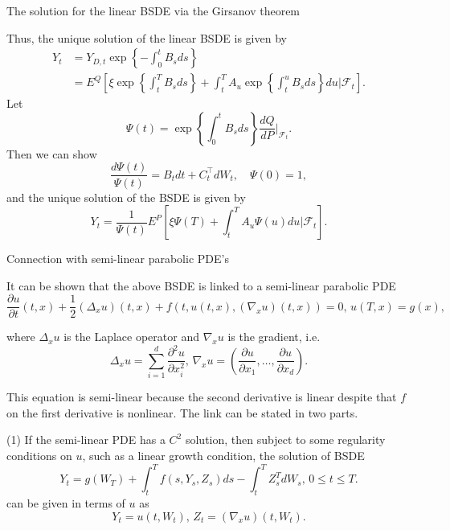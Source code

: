 \documentclass{beamer}
\begin{document}
\begin{frame}{The solution for the linear BSDE via the Girsanov theorem}

    {\footnotesize \footnotesize
     Thus, the unique solution of the linear BSDE is given by
     \begin{align*}
        Y_t &= Y_{D,t} \exp \left\{ -\int_0^t B_s ds \right\}\\
        &= E^Q \left[ \xi \exp \left\{ \int_t^T B_s ds \right\} 
+ \int_t^T A_u \exp \left\{ \int_t^u B_s ds \right\} du |\mathcal{F}_t \right].
     \end{align*}
Let
\[
\Psi(t) = \exp \left\{ \int_0^t B_s ds \right\} \frac{dQ}{dP} \Big|_{\mathcal{F}_t}.
\]
Then we can show 
\[
\frac{d\Psi(t)}{\Psi(t)} = B_t dt + C_t^\top dW_t, \quad \Psi(0) = 1,
\]
and the unique solution of the BSDE is given by
\[
Y_t = \frac{1}{\Psi(t)} E^P \left[ \xi \Psi(T) + \int_t^T A_u \Psi(u) du |\mathcal{F}_t \right].
\]

    }
    
\end{frame}
\begin{frame}{Connection with semi-linear parabolic PDE's}

    {\footnotesize \footnotesize
      It can be shown that the above BSDE is linked to a semi-linear parabolic PDE  
\[
\frac{\partial u}{\partial t}(t,x) + \frac{1}{2}(\Delta_x u)(t,x)
 + f(t,u(t,x),(\nabla_x u)(t,x)) = 0, \, u(T,x) = g(x),
\]

where \(\Delta_x u\) is the Laplace operator and \(\nabla_x u\) is the gradient, i.e.
\[
\Delta_x u = \sum_{i=1}^d \frac{\partial^2 u}{\partial x_i^2}, \, \nabla_x u 
= \left( \frac{\partial u}{\partial x_1}, \ldots, \frac{\partial u}{\partial x_d} \right).
\]

\par This equation is semi-linear because the second derivative is linear despite 
that \(f\) on the first derivative is nonlinear. The link can be stated in two parts.
\vspace{1em}
\par (1) If the semi-linear PDE has a \(C^2\) solution, then subject to some regularity conditions on \(u\), such as a linear growth condition, the solution of BSDE  
\[
Y_t = g(W_T) + \int_t^T f(s,Y_s,Z_s)ds - \int_t^T Z_s^T dW_s, \, 0 \leq t \leq T.
\]
can be given in terms of \(u\) as  
\[
Y_t = u(t,W_t), \, Z_t = (\nabla_x u)(t,W_t).
\]
    }
    
\end{frame}
\end{document}
